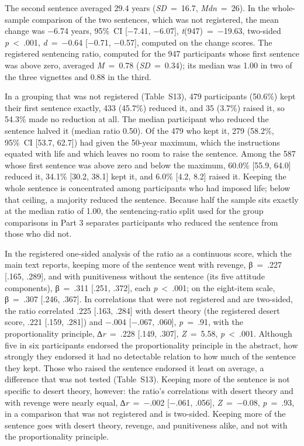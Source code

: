 The second sentence averaged 29.4 years (\emph{SD}~=~16.7, \emph{Mdn}~=~26). In the whole-sample comparison of the two sentences, which was not registered, the mean change was −6.74 years, 95\%~CI {[}−7.41, −6.07{]}, \emph{t}(947)~=~−19.63, two-sided \emph{p}~\textless{}~.001, \emph{d}~=~−0.64 {[}−0.71, −0.57{]}, computed on the change scores. The registered sentencing ratio, computed for the 947 participants whose first sentence was above zero, averaged \emph{M}~=~0.78 (\emph{SD}~=~0.34); its median was 1.00 in two of the three vignettes and 0.88 in the third.

In a grouping that was not registered (Table~S13), 479 participants (50.6\%) kept their first sentence exactly, 433 (45.7\%) reduced it, and 35 (3.7\%) raised it, so 54.3\% made no reduction at all. The median participant who reduced the sentence halved it (median ratio 0.50). Of the 479 who kept it, 279 (58.2\%, 95\%~CI {[}53.7, 62.7{]}) had given the 50-year maximum, which the instructions equated with life and which leaves no room to raise the sentence. Among the 587 whose first sentence was above zero and below the maximum, 60.0\% {[}55.9, 64.0{]} reduced it, 34.1\% {[}30.2, 38.1{]} kept it, and 6.0\% {[}4.2, 8.2{]} raised it. Keeping the whole sentence is concentrated among participants who had imposed life; below that ceiling, a majority reduced the sentence. Because half the sample sits exactly at the median ratio of 1.00, the sentencing-ratio split used for the group comparisons in Part 3 separates participants who reduced the sentence from those who did not.

In the registered one-sided analysis of the ratio as a continuous score, which the main text reports, keeping more of the sentence went with revenge, β~=~.227 {[}.165, .289{]}, and with punitiveness without the sentence (its five attitude components), β~=~.311 {[}.251, .372{]}, each \emph{p}~\textless{}~.001; on the eight-item scale, β~=~.307 {[}.246, .367{]}. In correlations that were not registered and are two-sided, the ratio correlated .225 {[}.163, .284{]} with desert theory (the registered desert score, .221 {[}.159, .281{]}) and −.004 {[}−.067, .060{]}, \emph{p}~=~.91, with the proportionality principle, ∆\emph{r}~=~.228 {[}.149, .307{]}, \emph{Z}~=~5.58, \emph{p}~\textless{}~.001. Although five in six participants endorsed the proportionality principle in the abstract, how strongly they endorsed it had no detectable relation to how much of the sentence they kept. Those who raised the sentence endorsed it least on average, a difference that was not tested (Table~S13). Keeping more of the sentence is not specific to desert theory, however: the ratio's correlations with desert theory and with revenge were nearly equal, ∆\emph{r}~=~−.002 {[}−.061, .056{]}, \emph{Z}~=~−0.08, \emph{p}~=~.93, in a comparison that was not registered and is two-sided. Keeping more of the sentence goes with desert theory, revenge, and punitiveness alike, and not with the proportionality principle.

